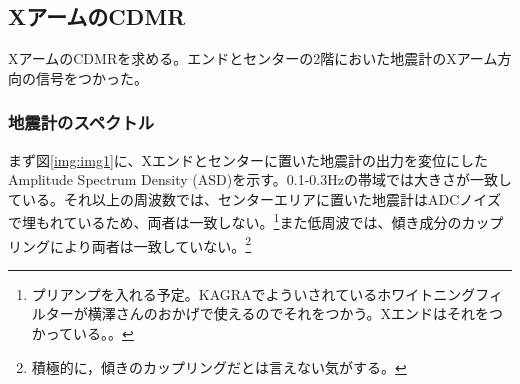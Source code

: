 




\subsection{XアームのCDMR}
XアームのCDMRを求める。エンドとセンターの2階においた地震計のXアーム方向の信号をつかった。

\subsubsection{地震計のスペクトル}
まず図\ref{img:img1}に、Xエンドとセンターに置いた地震計の出力を変位にしたAmplitude Spectrum Density (ASD)を示す。0.1-0.3Hzの帯域では大きさが一致している。それ以上の周波数では、センターエリアに置いた地震計はADCノイズで埋もれているため、両者は一致しない。\footnote[6]{プリアンプを入れる予定。KAGRAでよういされているホワイトニングフィルターが横澤さんのおかげで使えるのでそれをつかう。Xエンドはそれをつかっている。。}また低周波では、傾き成分のカップリングにより両者は一致していない。\footnote[7]{積極的に，傾きのカップリングだとは言えない気がする。}

